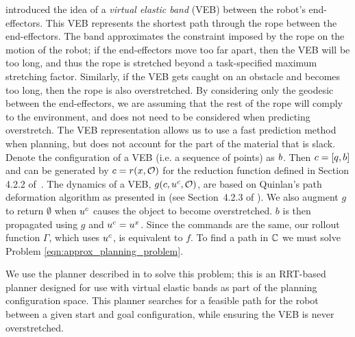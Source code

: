 \cite{McConachie2017} introduced the idea of a \textit{virtual elastic band} (VEB) between the robot's end-effectors. This VEB represents the shortest path through the rope between the end-effectors. The band approximates the constraint imposed by the rope on the motion of the robot; if the end-effectors move too far apart, then the VEB will be too long, and thus the rope is stretched beyond a task-specified maximum stretching factor. Similarly, if the VEB gets caught on an obstacle and becomes too long, then the rope is also overstretched. By considering only the geodesic between the end-effectors, we are assuming that the rest of the rope will comply to the environment, and does not need to be considered when predicting overstretch. The VEB representation allows us to use a fast prediction method when planning, but does not account for the part of the material that is slack. Denote the configuration of a VEB (i.e. a sequence of points) as $b$. Then $c = [q,b]$ and can be generated by $c = r(x,\mathcal{O})$ for the reduction function defined in Section 4.2.2 of~\cite{McConachie2017}. The dynamics of a VEB, $g(c,u^c,\mathcal{O})$, are based on Quinlan's path deformation algorithm as presented in \cite{Quinlan1994} (see Section~4.2.3 of \cite{McConachie2017}). We also augment $g$ to return $\emptyset$ when $u^c$ causes the object to become overstretched. %
$b$ is then propagated using $g$ and $u^c = u^x$. Since the commands are the same, our rollout function $\Gamma$, which uses $u^c$, is equivalent to $f$. To find a path in $\mathbb{C}$ we must solve Problem \eqref{eqn:approx_planning_problem}.


We use the planner described in \cite{McConachie2020} to solve this problem; this is an RRT-based planner designed for use with virtual elastic bands as part of the planning configuration space. This planner searches for a feasible path for the robot between a given start and goal configuration, while ensuring the VEB is never overstretched.

